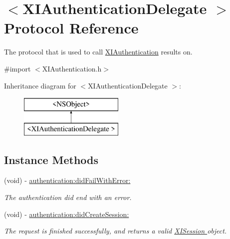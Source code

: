 \hypertarget{protocol_x_i_authentication_delegate_01-p}{}\section{$<$X\+I\+Authentication\+Delegate $>$ Protocol Reference}
\label{protocol_x_i_authentication_delegate_01-p}


The protocol that is used to call \hyperlink{class_x_i_authentication}{X\+I\+Authentication} results on.  




{\ttfamily \#import $<$X\+I\+Authentication.\+h$>$}

Inheritance diagram for $<$X\+I\+Authentication\+Delegate $>$\+:\begin{figure}[H]
\begin{center}
\leavevmode
\includegraphics[height=2.000000cm]{protocol_x_i_authentication_delegate_01-p}
\end{center}
\end{figure}
\subsection*{Instance Methods}
\begin{DoxyCompactItemize}
\item 
(void) -\/ \hyperlink{protocol_x_i_authentication_delegate_01-p_a926311c03672c51b3a58e8590bc74c14}{authentication\+:did\+Fail\+With\+Error\+:}
\begin{DoxyCompactList}\small\item\em The authentication did end with an error. \end{DoxyCompactList}\item 
(void) -\/ \hyperlink{protocol_x_i_authentication_delegate_01-p_a4f0b8feb3b461d717acc0fc627f1d04d}{authentication\+:did\+Create\+Session\+:}
\begin{DoxyCompactList}\small\item\em The request is finished successfully, and returns a valid \hyperlink{}{X\+I\+Session } object. \end{DoxyCompactList}\end{DoxyCompactItemize}


